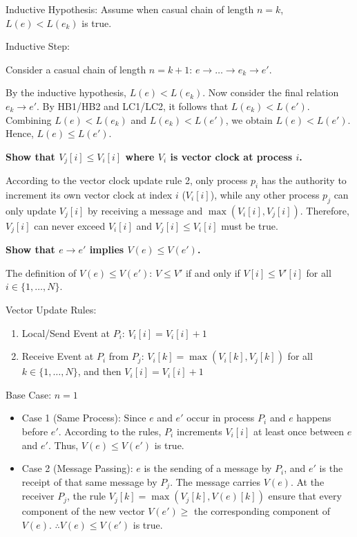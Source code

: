 \documentclass[12pt,a4paper]{article}
\begin{document}
Inductive Hypothesis: Assume when casual chain of length $n=k$, $L(e) < L(e_k)$ is true.

Inductive Step:

Consider a casual chain of length $n=k+1$: $e \rightarrow \dots \rightarrow e_k \rightarrow e'$.

By the inductive hypothesis, $L(e) < L(e_k)$.
Now consider the final relation $e_k \rightarrow e'$. By HB1/HB2 and LC1/LC2, it follows that $L(e_k) < L(e')$.
Combining $L(e) < L(e_k)$ and $L(e_k) < L(e')$, we obtain $L(e) < L(e')$.
Hence, $L(e) \le L(e')$.


\textbf{Show that $V_j[i] \le V_i[i]$ where $V_i$ is vector clock at process $i$.}

According to the vector clock update rule 2, only process $p_i$ has the authority to increment its own vector clock at index $i$ ($V_i[i]$), 
while any other process $p_j$ can only update $V_j[i]$ by receiving a message and $\max(V_i[i], V_j[i])$. 
Therefore, $V_j[i]$ can never exceed $V_i[i]$ and $V_j[i] \le V_i[i]$ must be true.

\textbf{Show that $e \to e'$ implies $V(e) \le V(e')$.}

The definition of $V(e) \le V(e')$: $V \le V'$ if and only if $V[i] \le V'[i]$ for all $i \in \{1, \dots, N\}$.

Vector Update Rules:

\begin{enumerate}
    \item Local/Send Event at $P_i$: $V_i[i] = V_i[i] + 1$
    \item Receive Event at $P_i$ from $P_j$: $V_i[k] = \max(V_i[k], V_j[k])$ for all $k \in \{1, \dots, N\}$, and then $V_i[i] = V_i[i] + 1$
\end{enumerate}

Base Case: $n=1$

\begin{itemize}
    \item Case 1 (Same Process): Since $e$ and $e'$ occur in process $P_i$ and $e$ happens before $e'$. According to the rules, 
    $P_i$ increments $V_i[i]$ at least once between $e$ and $e'$. Thus, $V(e) \le V(e')$ is true.
    \item Case 2 (Message Passing): $e$ is the sending of a message by $P_i$, and $e'$ is the receipt of that same message by $P_j$. 
    The message carries $V(e)$. At the receiver $P_j$, the rule $V_j[k] = \max(V_j[k], V(e)[k])$ ensure that every component of the new vector $V(e') \ge$ the corresponding component of $V(e)$. $\therefore V(e) \le V(e')$ is true.
\end{itemize}
\end{document}

